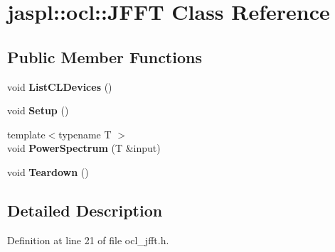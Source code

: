 \hypertarget{classjaspl_1_1ocl_1_1_j_f_f_t}{}\section{jaspl\+:\+:ocl\+:\+:J\+F\+FT Class Reference}
\label{classjaspl_1_1ocl_1_1_j_f_f_t}
\subsection*{Public Member Functions}
\begin{DoxyCompactItemize}
\item 
void {\bfseries List\+C\+L\+Devices} ()\hypertarget{classjaspl_1_1ocl_1_1_j_f_f_t_a345a5366d1bfc966d6e0b5932b2624d8}{}\label{classjaspl_1_1ocl_1_1_j_f_f_t_a345a5366d1bfc966d6e0b5932b2624d8}

\item 
void {\bfseries Setup} ()\hypertarget{classjaspl_1_1ocl_1_1_j_f_f_t_ad68656a8859214cea4bb4ed5dca93995}{}\label{classjaspl_1_1ocl_1_1_j_f_f_t_ad68656a8859214cea4bb4ed5dca93995}

\item 
{\footnotesize template$<$typename T $>$ }\\void {\bfseries Power\+Spectrum} (T \&input)\hypertarget{classjaspl_1_1ocl_1_1_j_f_f_t_a2d41202ab9b3231f1c347cd8cbc465f3}{}\label{classjaspl_1_1ocl_1_1_j_f_f_t_a2d41202ab9b3231f1c347cd8cbc465f3}

\item 
void {\bfseries Teardown} ()\hypertarget{classjaspl_1_1ocl_1_1_j_f_f_t_aca6fb3c6a7f7d7c7d04aeac51b2b8c2f}{}\label{classjaspl_1_1ocl_1_1_j_f_f_t_aca6fb3c6a7f7d7c7d04aeac51b2b8c2f}

\end{DoxyCompactItemize}


\subsection{Detailed Description}


Definition at line 21 of file ocl\+\_\+jfft.\+h.

